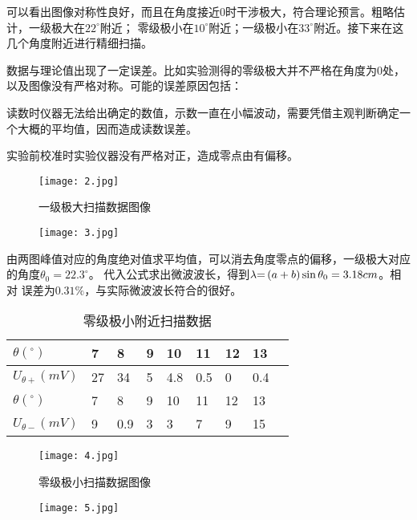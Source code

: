 \documentclass[12pt,a4paper]{article}
\begin{document}
    可以看出图像对称性良好，而且在角度接近0时干涉极大，符合理论预言。粗略估计，一级极大在$22^{\circ}$附近；
    零级极小在$10^{\circ}$附近；一级极小在$33^{\circ}$附近。接下来在这几个角度附近进行精细扫描。

    数据与理论值出现了一定误差。比如实验测得的零级极大并不严格在角度为0处，以及图像没有严格对称。可能的误差原因包括：
    
    读数时仪器无法给出确定的数值，示数一直在小幅波动，需要凭借主观判断确定一个大概的平均值，因而造成读数误差。

    实验前校准时实验仪器没有严格对正，造成零点由有偏移。
    \begin{figure}[H]
        \centering
        \caption{一级极大扫描数据图像}
        \texttt{[image: 2.jpg]}
    \end{figure}

    \begin{figure}[H]
        \centering
        \texttt{[image: 3.jpg]}
    \end{figure}

    由两图峰值对应的角度绝对值求平均值，可以消去角度零点的偏移，一级极大对应的角度$\theta_0=22.3^{\circ}$。
    代入公式求出微波波长，得到$\lambda {\rm{ = }}\left( {a + b} \right)\sin {\theta _0} = 3.18cm$。相对
    误差为$0.31\%$，与实际微波波长符合的很好。

    \begin{table}[H]
        \centering
        \caption{零级极小附近扫描数据}
        \begin{tabular}{|l|l|l|l|l|l|l|l|l|}
        \hline
            $\theta(^\circ)$ & 7 & 8 & 9 & 10 & 11 & 12 & 13  \\ \hline
            $U_{\theta+}(mV)$ & 27 & 34 & 5 & 4.8 & 0.5 & 0 & 0.4 \\ \hline
            $\theta(^\circ)$ & 7 & 8 & 9 & 10 & 11 & 12 & 13 \\ \hline
            $U_{\theta-}(mV)$ & 9 & 0.9 & 3 & 3 & 7 & 9 & 15  \\ \hline
        \end{tabular}
    \end{table}

    \begin{figure}[H]
        \centering
        \caption{零级极小扫描数据图像}
        \texttt{[image: 4.jpg]}
    \end{figure}
    \begin{figure}[H]
        \centering
        \texttt{[image: 5.jpg]}
    \end{figure}
\end{document}

